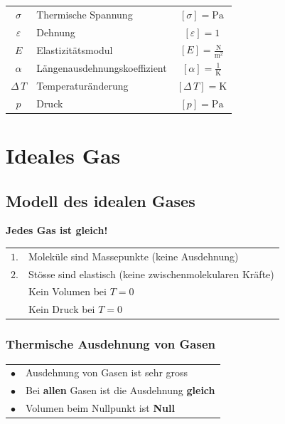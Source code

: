 \begin{tabular}{c l c}
		$\sigma$ & Thermische Spannung & $[\sigma] = \mathrm{Pa}$ \\
		$\varepsilon$ & Dehnung & $[\varepsilon] = 1$ \\
		\rule{0pt}{8pt}$E$ & Elastizitätsmodul & $[E] = \mathrm{\frac{N}{m^2}}$ \\
		\rule{0pt}{8pt}$\alpha$ & Längenausdehnungskoeffizient & $[\alpha] = \mathrm{\frac{1}{K}}$ \\ 
		$\Delta \, T $ & Temperaturänderung & $[\Delta \, T ] = \mathrm{K}$ \\
		$p$ & Druck & $[p] = \mathrm{Pa} $ \\
\end{tabular}






\section{Ideales Gas}

\subsection{Modell des idealen Gases}
\textbf{Jedes Gas ist gleich!} \\


\begin{tabular}{ll}
$1.$ & Moleküle sind Massepunkte (keine Ausdehnung) \\
$2.$ & Stösse sind elastisch (keine zwischenmolekularen Kräfte) \\
& Kein Volumen bei $T = 0$ \\
& Kein Druck bei $T = 0$ \\
\end{tabular}





\subsubsection{Thermische Ausdehnung von Gasen}
\begin{tabular}{ll}
$\bullet$ & Ausdehnung von Gasen ist sehr gross \\
$\bullet$ & Bei \textbf{allen} Gasen ist die Ausdehnung \textbf{gleich} \\
$\bullet$ & Volumen beim Nullpunkt ist \textbf{Null} \\
\end{tabular}




